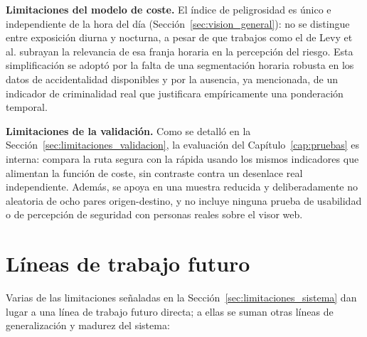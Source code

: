 \textbf{Limitaciones del modelo de coste.} El índice de peligrosidad es único e independiente de la hora del día (Sección~\ref{sec:vision_general}): no se distingue entre exposición diurna y nocturna, a pesar de que trabajos como el de Levy et al. \cite{levy2020} subrayan la relevancia de esa franja horaria en la percepción del riesgo. Esta simplificación se adoptó por la falta de una segmentación horaria robusta en los datos de accidentalidad disponibles y por la ausencia, ya mencionada, de un indicador de criminalidad real que justificara empíricamente una ponderación temporal.

\textbf{Limitaciones de la validación.} Como se detalló en la Sección~\ref{sec:limitaciones_validacion}, la evaluación del Capítulo~\ref{cap:pruebas} es interna: compara la ruta segura con la rápida usando los mismos indicadores que alimentan la función de coste, sin contraste contra un desenlace real independiente. Además, se apoya en una muestra reducida y deliberadamente no aleatoria de ocho pares origen-destino, y no incluye ninguna prueba de usabilidad o de percepción de seguridad con personas reales sobre el visor web.

\section{Líneas de trabajo futuro}
\label{sec:trabajo_futuro}

Varias de las limitaciones señaladas en la Sección~\ref{sec:limitaciones_sistema} dan lugar a una línea de trabajo futuro directa; a ellas se suman otras líneas de generalización y madurez del sistema:

